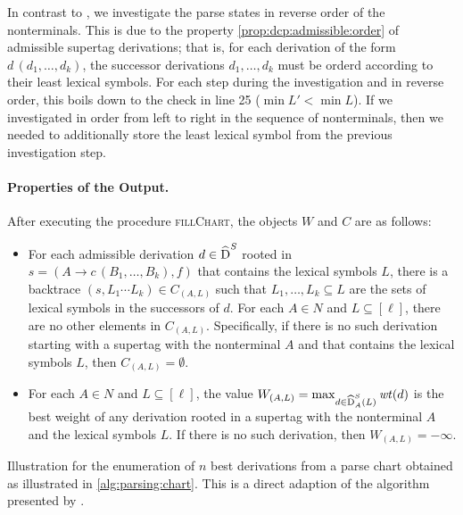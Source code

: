 \documentclass[../../document.tex]{subfiles}
\begin{document}
    In contrast to , we investigate the parse states in reverse order of the  nonterminals.
    This is due to the property \cref{prop:dcp:admissible:order} of admissible  supertag derivations; that is, for each derivation of the form \(d\,(d_1, \ldots, d_k)\), the successor derivations \(d_1, \ldots, d_k\) must be orderd according to their least lexical symbols.
    For each step during the investigation and in reverse order, this boils down to the check in line 25 (\(\min L' < \min L\)).
    If we investigated in order from left to right in the sequence of  nonterminals, then we needed to additionally store the least lexical symbol from the previous investigation step.

    \paragraph{Properties of the Output.} After executing the procedure \textsc{fillChart}, the objects \(W\) and \(C\) are as follows:
    \begin{itemize}
        \item For each admissible derivation \(d \in \widehat{\operatorname{D}}^S\) rooted in \(s = (A \to c\,(B_1, \ldots, B_k), f)\) that contains the lexical symbols \(L\), there is a backtrace \((s, L_1 \cdots L_k) \in C_{(A, L)}\) such that \(L_1, \ldots, L_k \subseteq L\) are the sets of lexical symbols in the successors of \(d\).
        For each \(A\in N\) and \(L \subseteq [\ell]\), there are no other elements in \(C_{(A,L)}\). Specifically, if there is no such derivation starting with a supertag with the  nonterminal \(A\) and that contains the lexical symbols \(L\), then \(C_{(A,L)} = \emptyset\).
        \item For each \(A \in N\) and \(L \subseteq [\ell]\), the value \(W_{(A, L)} = \max_{d \in \widehat{\operatorname{D}}^S_A(L)} \mathit{wt}(d)\) is the best weight of any derivation rooted in a supertag with the  nonterminal \(A\) and the lexical symbols \(L\). If there is no such derivation, then \(W_{(A, L)} = -\infty\).
    \end{itemize}

    \begin{algorithm}
        \caption{\label{alg:parsing:deriv}
            Illustration for the enumeration of $n$ best derivations from a parse chart obtained as illustrated in \cref{alg:parsing:chart}.
            This is a direct adaption of the algorithm presented by \citet{HuaChia05}.
        }
        
    \end{algorithm}
\end{document}
